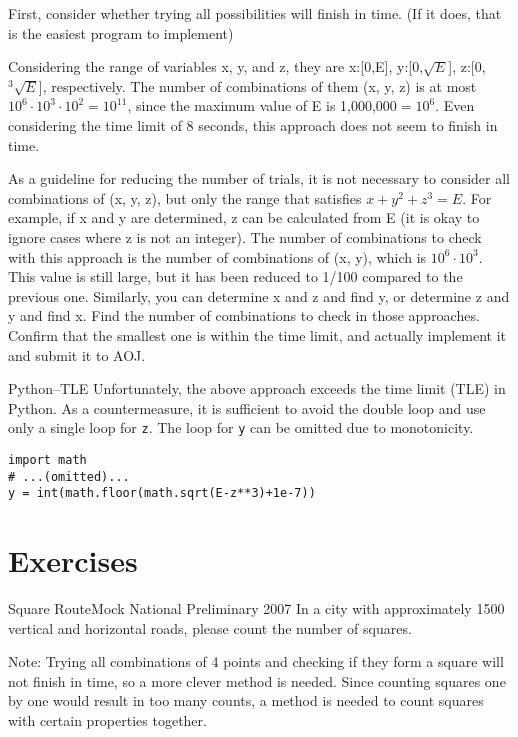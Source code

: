 First, consider whether trying all possibilities will finish in time.
(If it does, that is the easiest program to implement)

Considering the range of variables x, y, and z, they are x:[0,E], y:[0,$\sqrt{E}$],
z:[0,${}^3\sqrt{E}$], respectively. The number of combinations of them (x, y, z) is at most $10^6 \cdot 10^3 \cdot 10^2=10^{11}$, since the maximum value of E is 1,000,000$=10^6$.
Even considering the time limit of 8 seconds, this approach does not seem to finish in time.

As a guideline for reducing the number of trials, it is not necessary to consider all combinations of (x, y, z), but only the range that satisfies $x+y^2+z^3=E$. For example, if x and y are determined, z can be calculated from E (it is okay to ignore cases where z is not an integer). The number of combinations to check with this approach is the number of combinations of (x, y), which is $10^6 \cdot 10^3$.
This value is still large, but it has been reduced to 1/100 compared to the previous one. Similarly, you can determine x and z and find y, or determine z and y and find x. Find the number of combinations to check in those approaches. Confirm that the smallest one is within the time limit, and actually implement it and submit it to AOJ.

\begin{debugbox}{Python--TLE}
Unfortunately, the above approach exceeds the time limit (TLE) in Python. As a countermeasure, it is sufficient to avoid the double loop and use only a single loop for \texttt{z}.
The loop for \texttt{y} can be omitted due to monotonicity.
\begin{pybox}
\begin{verbatim}
import math
# ...(omitted)...
y = int(math.floor(math.sqrt(E-z**3)+1e-7))
\end{verbatim}
\end{pybox}
\end{debugbox}

\section{Exercises}
\begin{pbox}{Square Route}{Mock National Preliminary 2007}
In a city with approximately 1500 vertical and horizontal roads, please count the number of squares.

\end{pbox}

Note: Trying all combinations of 4 points and checking if they form a square will not finish in time, so a more clever method is needed. Since counting squares one by one would result in too many counts, a method is needed to count squares with certain properties together.

